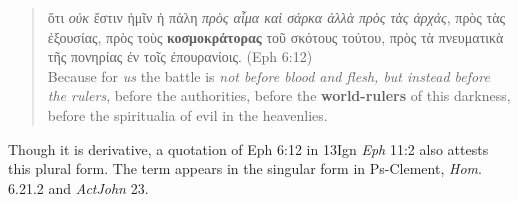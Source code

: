  \begin{quote}ὅτι \textit{οὐκ} ἔστιν ἡμῖν ἡ πάλη \textit{πρὸς αἷμα καὶ σάρκα ἀλλὰ πρὸς τὰς ἀρχάς}, %
  πρὸς τὰς ἐξουσίας, πρὸς τοὺς \textbf{κοσμοκράτορας} τοῦ σκότους τούτου, %
  πρὸς τὰ πνευματικὰ τῆς πονηρίας ἐν τοῖς ἐπουρανίοις. (Eph 6:12) \\[1mm] %
  Because for \textit{us} the battle is \textit{not before blood and flesh, %
  but instead before the rulers}, %
  before the authorities, before the \textbf{world-rulers} of this darkness, %
  before the spiritualia of evil in the heavenlies. %
  \end{quote} %
 \vspace*{3mm}

Though it is derivative, a quotation of Eph 6:12 in 13Ign \textit{Eph} 11:2 also attests this plural form. %
The term appears in the singular form in Ps-Clement, \textit{Hom}. 6.21.2 %
and \textit{ActJohn} 23. %